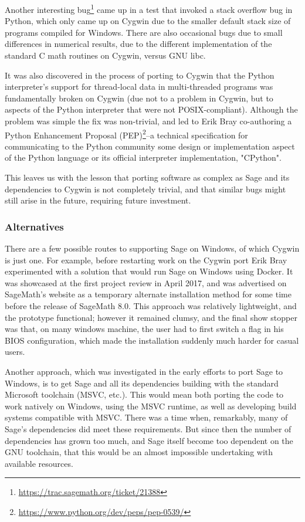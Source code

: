 Another interesting bug\footnote{\url{https://trac.sagemath.org/ticket/21388}}
came up in a test that invoked a stack overflow bug in Python, which only came
up on Cygwin due to the smaller default stack size of programs compiled for
Windows.  There are also occasional bugs due to small differences in numerical
results, due to the different implementation of the standard C math routines on
Cygwin, versus GNU libc.

It was also discovered in the process of porting to Cygwin that the Python
interpreter's support for thread-local data in multi-threaded programs was
fundamentally broken on Cygwin (due not to a problem in Cygwin, but to aspects
of the Python interpreter that were not POSIX-compliant).  Although the problem
was simple the fix was non-trivial, and led to Erik Bray co-authoring a Python
Enhancement Proposal
(PEP)\footnote{\url{https://www.python.org/dev/peps/pep-0539/}}--a technical
specification for communicating to the Python community some design or
implementation aspect of the Python language or its official interpreter
implementation, "CPython".

This leaves us with the lesson that porting software as complex as Sage and its
dependencies to Cygwin is not completely trivial, and that similar bugs might
still arise in the future, requiring future investment.

\hypertarget{alternatives}{%
\subsubsection{Alternatives}\label{alternatives}}

There are a few possible routes to supporting Sage on Windows, of which
Cygwin is just one. For example, before restarting work on the Cygwin
port Erik Bray experimented with a solution that would run Sage on
Windows using Docker.
It was showcased at the first project review in
April 2017, and was advertised on SageMath's website as a temporary
alternate installation method for some time before the release of
SageMath 8.0.
This approach was relatively lightweight, and the prototype functional;
however it remained clumsy, and the final show stopper was that, on many
windows machine, the user had to first switch a flag in his BIOS
configuration, which made the installation suddenly much harder for
casual users.

Another approach, which was investigated in the early efforts to port Sage
to Windows, is to get Sage and all its dependencies building with
the standard Microsoft toolchain (MSVC, etc.). This would mean both
porting the code to work natively on Windows, using the MSVC runtime, as
well as developing build systems compatible with MSVC. There was a time
when, remarkably, many of Sage's dependencies did meet these
requirements. But since then the number of dependencies has grown too
much, and Sage itself become too dependent on the GNU toolchain, that
this would be an almost impossible undertaking with available resources.

